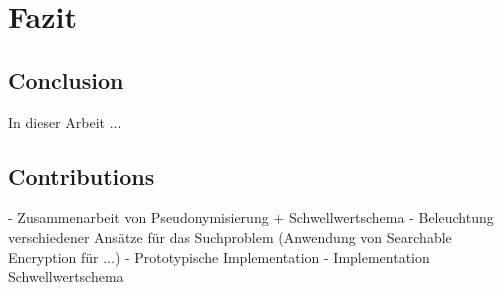 \chapter{Fazit}

\label{cha_final}





\section{Conclusion}

In dieser Arbeit ...

\section{Contributions}

- Zusammenarbeit von Pseudonymisierung + Schwellwertschema
- Beleuchtung verschiedener Ansätze für das Suchproblem (Anwendung von Searchable Encryption für ...)
- Prototypische Implementation
- Implementation Schwellwertschema 

